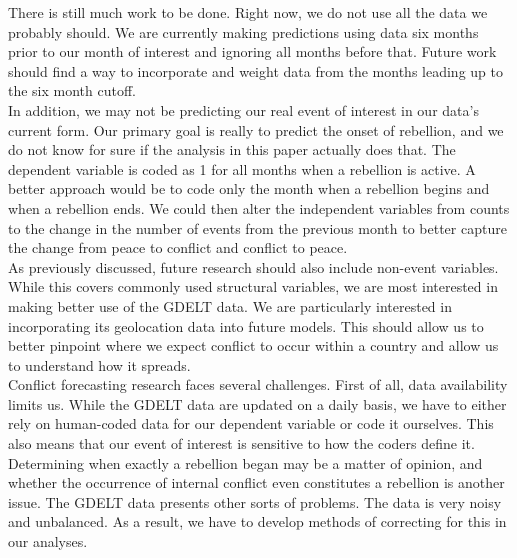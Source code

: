 \documentclass[12pt, letterpaper]{article}
\begin{document}
There is still much work to be done. Right now, we do not use all the data we probably should. We are currently making predictions using data six 
months prior to our month of interest and ignoring all months before that. Future work should find a way to incorporate and weight data from the 
months leading up to the six month cutoff. \\

In addition, we may not be predicting our real event of interest in our data's current form. Our primary goal is really to predict the onset of 
rebellion, and we do not know for sure if the analysis in this paper actually does that. The dependent variable is coded as 1 for all months when a 
rebellion is active. A better approach would be to code only the month when a rebellion begins and when a rebellion ends. We could then alter the 
independent variables from counts to the change in the number of events from the previous month to better capture the change from peace to conflict 
and conflict to peace. \\

As previously discussed, future research should also include non-event variables. While this covers commonly used structural variables, we are most 
interested in making better use of the GDELT data. We are particularly interested in incorporating its geolocation data into future models.
This should allow us to better pinpoint where we expect conflict to occur within a country and allow us to understand how it spreads.\\



Conflict forecasting research faces several challenges. First of all, data availability limits us. While the GDELT data are updated on a daily basis, we have to either rely on human-coded data for our dependent variable or code it ourselves. This also means that our event of interest is sensitive to how the coders define it. Determining when exactly a rebellion began may be a matter of opinion, and whether the occurrence of internal conflict even constitutes a rebellion is another issue. The GDELT data presents other sorts of problems. The data is very noisy and unbalanced. As a result, we have to develop methods of correcting for this in our analyses. \\
\end{document}
